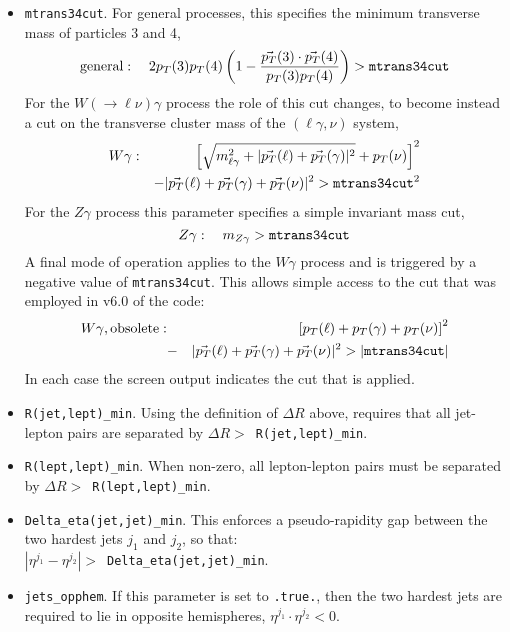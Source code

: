 \documentclass[12pt]{article}
\begin{document}
\begin{itemize}
\item {\tt mtrans34cut}. For general processes, this specifies the
minimum transverse mass of particles 3 and 4,
\begin{equation}
\mbox{general}: \quad 2 p_T(3) p_T(4) \left( 1 - \frac{\vec{p_T}(3) \cdot \vec{p_T}(4)}{p_T(3) p_T(4)} \right) 
> {\tt mtrans34cut} 
\end{equation}
For the $W(\to \ell \nu)\gamma$ process the role of this cut changes, to become
instead a cut on the transverse cluster mass of the $(\ell\gamma,\nu)$ system,
\begin{eqnarray}
 W\gamma: && \left[ \sqrt{m_{\ell\gamma}^2 + |\vec{p_T}(\ell)+\vec{p_T}(\gamma)|^2} + p_T(\nu) \right]^2
  \nonumber \\ &&
  -|\vec{p_T}(\ell)+\vec{p_T}(\gamma)+\vec{p_T}(\nu)|^2 > {\tt mtrans34cut}^2
\end{eqnarray}
For the $Z\gamma$ process this parameter specifies a simple invariant mass cut,
\begin{equation}
 Z\gamma: \quad m_{Z\gamma} > {\tt mtrans34cut}
\end{equation}
A final mode of operation applies to the $W\gamma$ process and is triggered by a negative value
of {\tt mtrans34cut}. This allows simple access to the cut that was employed in v6.0 of the code:
\begin{eqnarray}
 W\gamma, \mbox{obsolete}: &&
   \left[ p_T(\ell) +  p_T(\gamma) +  p_T(\nu) \right]^2 \nonumber \\ 
  &-&|\vec{p_T}(\ell)+\vec{p_T}(\gamma)+\vec{p_T}(\nu)|^2 > |{\tt mtrans34cut}|
\end{eqnarray}
In each case the screen output indicates the cut that is applied.

\item {\tt R(jet,lept)\_min}. Using the definition of $\Delta R$ above,
requires that all jet-lepton pairs are separated by
$\Delta R >$~{\tt R(jet,lept)\_min}.

\item {\tt R(lept,lept)\_min}. When non-zero, all lepton-lepton pairs
must be separated by $\Delta R >$~{\tt R(lept,lept)\_min}.

\item {\tt Delta\_eta(jet,jet)\_min}. This enforces a pseudo-rapidity
gap between the two hardest jets $j_1$ and $j_2$, so that: \\
$|\eta^{j_1} - \eta^{j_2}| >$~{\tt Delta\_eta(jet,jet)\_min}.

\item {\tt jets\_opphem}. If this parameter is set to {\tt .true.},
then the two hardest jets are required to lie in opposite hemispheres,
$\eta^{j_1} \cdot \eta^{j_2} < 0$.


\end{itemize}
\end{document}
